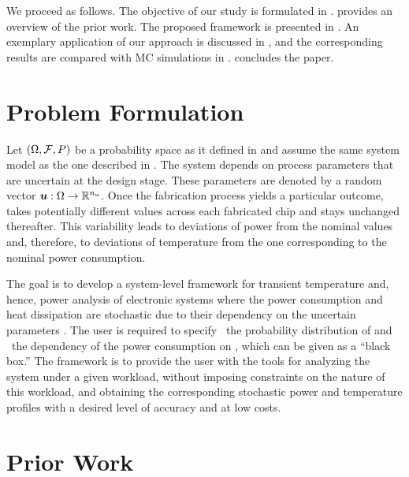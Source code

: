 We proceed as follows. The objective of our study is formulated in
.  provides an overview of the prior
work. The proposed framework is presented in . An
exemplary application of our approach is discussed in , and
the corresponding results are compared with \ac{MC} simulations in
.  concludes the paper.

\section{Problem Formulation}

Let $(\Omega, \mathcal{F}, \probability)$ be a probability space as it defined
in  and assume the same system model as the one
described in . The system depends on \nu process parameters
that are uncertain at the design stage. These parameters are denoted by a random
vector $\boldsymbol{u}: \Omega \to \mathbb{R}^{n_\mathrm{u}}$. Once the fabrication process yields a
particular outcome, \vu takes potentially different values across each
fabricated chip and stays unchanged thereafter. This variability leads to
deviations of power from the nominal values and, therefore, to deviations of
temperature from the one corresponding to the nominal power consumption.

The goal is to develop a system-level framework for transient temperature and,
hence, power analysis of electronic systems where the power consumption and heat
dissipation are stochastic due to their dependency on the uncertain parameters
\vu. The user is required to specify \one~the probability distribution of \vu
and \two~the dependency of the power consumption on \vu, which can be given as a
``black box.'' The framework is to provide the user with the tools for analyzing
the system under a given workload, without imposing constraints on the nature of
this workload, and obtaining the corresponding stochastic power \mp and
temperature \mq profiles with a desired level of accuracy and at low costs.

\section{Prior Work}

